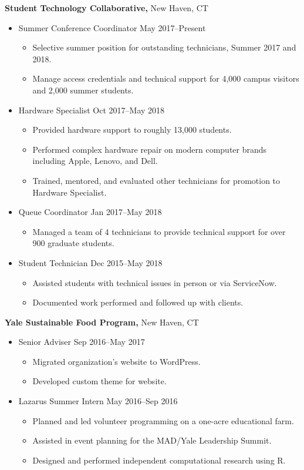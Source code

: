 \documentclass[11pt]{article}
\newcommand{\position}[2]{#1 \hfill #2}
\newcommand{\emphasized}[2]{\emphasis{#1} \medemph{#2}}
\newcommand{\emphasis}[1]{\textbf{\textsf{#1}}}
\newcommand{\medemph}[1]{\textsf{#1}}
\newenvironment{experience}{
	\begin{itemize}[leftmargin=*, topsep=0pt] %
		\setlength{\itemsep}{0pt} %
		\setlength{\parskip}{0pt} %
		\setlength{\parsep}{10pt} %
	}{
	\end{itemize}
}
\begin{document}
\emphasized{Student Technology Collaborative,}{New Haven, CT}
\begin{experience}
	\item \position{Summer Conference Coordinator}{May 2017--Present}
	\begin{experience}
		\item Selective summer position for outstanding technicians, Summer 2017 and 2018.
		\item Manage access credentials and technical support for 4,000 campus visitors and 2,000 summer students. 
	\end{experience}
	\item \position{Hardware Specialist}{Oct 2017--May 2018}
	\begin{experience}
		\item Provided hardware support to roughly 13,000 students.
		\item Performed complex hardware repair on modern computer brands including Apple, Lenovo, and Dell.
		\item Trained, mentored, and evaluated other technicians for promotion to Hardware Specialist. 
	\end{experience}
	\item \position{Queue Coordinator}{Jan 2017--May 2018}
	\begin{experience}
		\item Managed a team of 4 technicians to provide technical support for over 900 graduate students.
	\end{experience}
	\item \position{Student Technician}{Dec 2015--May 2018}
	\begin{experience}
		\item Assisted students with technical issues in person or via ServiceNow. 
		\item Documented work performed and followed up with clients.\\
	\end{experience}
\end{experience}

\emphasized{Yale Sustainable Food Program,}{New Haven, CT}
\begin{experience}
	\item \position{Senior Adviser}{Sep 2016--May 2017}
	\begin{experience}
		\item Migrated organization's website to WordPress. 
		\item Developed custom theme for website.
	\end{experience}
	\item \position{Lazarus Summer Intern}{May 2016--Sep 2016}
	\begin{experience}
		\item Planned and led volunteer programming on a one-acre educational farm. 
		\item Assisted in event planning for the MAD/Yale Leadership Summit. 
		\item Designed and performed independent computational research using R.\\
	\end{experience}
\end{experience}
\end{document}
